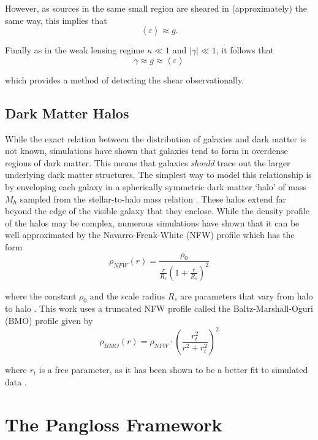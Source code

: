 \documentclass[%
 reprint,
 amsmath,amssymb,
 aps,nofootinbib
]{revtex4-1}
\begin{document}
\noindent However, as sources in the same small region are sheared in (approximately) the same way, this implies that
\begin{equation}
\left<\varepsilon\right>\approx g.
\end{equation}

 \noindent Finally as in the weak lensing regime ${\kappa\ll1}$ and ${|\gamma|\ll1}$, it follows that
 \begin{equation}
 \gamma\approx g\approx\left<\varepsilon\right>
 \end{equation}

 \noindent which provides a method of detecting the shear observationally.

\subsection*{Dark Matter Halos}

While the exact relation between the distribution of galaxies and dark matter is not known, simulations have shown that galaxies tend to form in overdense regions of dark matter. This means that galaxies \textit{should} trace out the larger underlying dark matter structures. The simplest way to model this relationship is by enveloping each galaxy in a spherically symmetric dark matter `halo' of mass $M_h$ sampled from the stellar-to-halo mass relation \cite{smhr}. These halos extend far beyond the edge of the visible galaxy that they enclose. While the density profile of the halos may be complex, numerous simulations have shown that it can be well approximated by the Navarro-Frenk-White (NFW) profile which has the form
\begin{equation}\label{nfw_profile}
\rho_{NFW}(r)=\frac{\rho_0}{\frac{r}{R_s}\left(1+\frac{r}{R_s}\right)^2}
\end{equation}

\noindent where the constant $\rho_0$ and the scale radius $R_s$ are parameters that vary from halo to halo \cite{nfw}. This work uses a truncated NFW profile called the Baltz-Marshall-Oguri (BMO) profile given by
\begin{equation}\label{bmo_profile}
\rho_{BMO}(r)=\rho_{NFW}\cdot\left(\frac{r_t^2}{r^2+r_t^2}\right)^2
\end{equation}

\noindent where $r_t$ is a free parameter, as it has been shown to be a better fit to simulated data \cite{nfw_bmo}.

\section{The Pangloss Framework}
\end{document}

